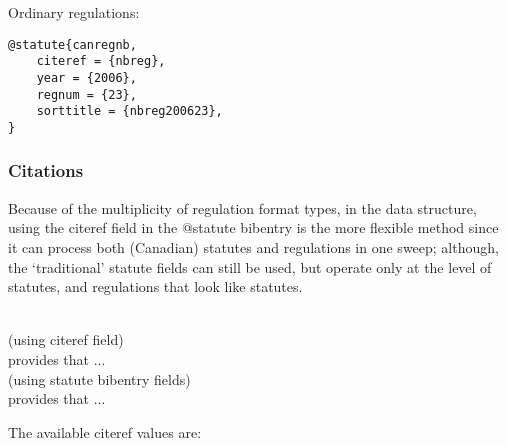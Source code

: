 Ordinary regulations: \par\bigskip
\begin{verbatim}
@statute{canregnb,
	citeref = {nbreg},
	year = {2006},
	regnum = {23},
	sorttitle = {nbreg200623},
}

\end{verbatim}

\subsubsection{Citations}



\par\bigskip
{}\par\bigskip
{}\par\bigskip
{}\par\bigskip

Because of the multiplicity of regulation format types, in the data structure, using the citeref field in the @statute bibentry is the more flexible method since it can process both (Canadian) statutes and regulations in one sweep; although, the `traditional' statute fields can still be used, but operate only at the level of statutes, and regulations that look like statutes.

\ \\
(using citeref field)\\
  provides that ...\\
(using statute bibentry fields) \\
 provides that ...
\par\bigskip

The available citeref values are:

\bigskip

